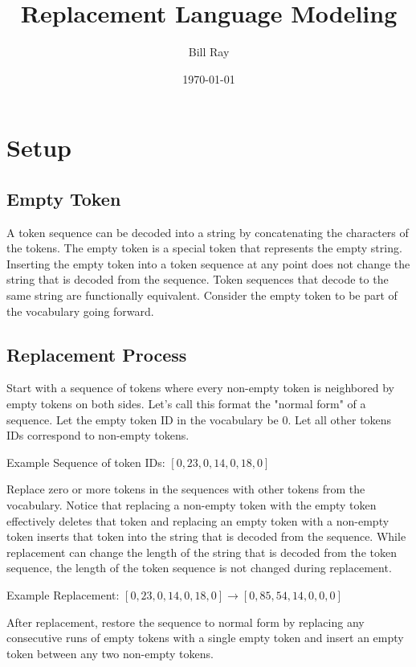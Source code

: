 \documentclass{article}
\title{Replacement Language Modeling}
\author{Bill Ray}
\date{\today}
\begin{document}
\maketitle

\section{Setup}

\subsection{Empty Token}
A token sequence can be decoded into a string by concatenating the characters of the tokens. The empty token is a special token that represents the empty string. Inserting the empty token into a token sequence at any point does not change the string that is decoded from the sequence. Token sequences that decode to the same string are functionally equivalent. Consider the empty token to be part of the vocabulary going forward.

\subsection{Replacement Process}
Start with a sequence of tokens where every non-empty token is neighbored by empty tokens on both sides. Let's call this format the "normal form" of a sequence. Let the empty token ID in the vocabulary be $0$. Let all other tokens IDs correspond to non-empty tokens.

\vspace*{1em}
\noindent Example Sequence of token IDs: $[0, 23, 0, 14, 0, 18, 0]$
\vspace*{1em}

Replace zero or more tokens in the sequences with other tokens from the vocabulary. Notice that replacing a non-empty token with the empty token effectively deletes that token and replacing an empty token with a non-empty token inserts that token into the string that is decoded from the sequence. While replacement can change the length of the string that is decoded from the token sequence, the length of the token sequence is not changed during replacement.

\vspace*{1em}
\noindent Example Replacement: $[0, 23, 0, 14, 0, 18, 0] \rightarrow [0, 85, 54, 14, 0, 0, 0]$
\vspace*{1em}

After replacement, restore the sequence to normal form by replacing any consecutive runs of empty tokens with a single empty token and insert an empty token between any two non-empty tokens.
\end{document}
